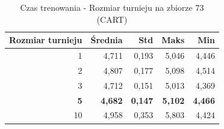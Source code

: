\begin{table}[htbp]
\centering
\small
\setlength{\tabcolsep}{6pt}
\renewcommand{\arraystretch}{1.2}
\caption{Czas trenowania - Rozmiar turnieju na zbiorze 73 (CART)}
\label{tab:CART_tournament_size_73_time}
\begin{tabular}{r|r|r|r|r}
\toprule
Rozmiar turnieju & Średnia & Std & Maks & Min \\
\hline
1 & 4,711 & 0,193 & 5,046 & 4,446 \\
2 & 4,807 & 0,177 & 5,098 & 4,514 \\
3 & 4,712 & 0,151 & 5,013 & 4,369 \\
\textbf{5} & \textbf{4,682} & \textbf{0,147} & \textbf{5,102} & \textbf{4,466} \\
10 & 4,958 & 0,353 & 5,803 & 4,424 \\
\bottomrule
\end{tabular}
\end{table}